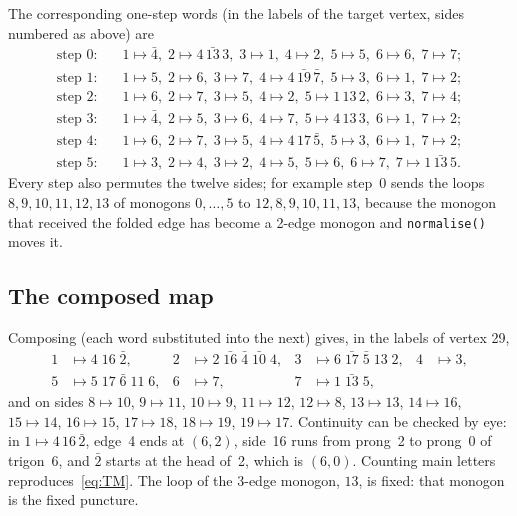 \documentclass[12pt]{amsart}
\newcommand{\anti}[1]{\bar{#1}}          %
\newcommand{\code}[1]{\texttt{#1}}
\theoremstyle{plain}
\theoremstyle{definition}
\begin{document}
The corresponding one-step words (in the labels of the target vertex,
sides numbered as above) are
\begin{align*}
  \text{step 0:}\quad & 1\mapsto\anti4,\; 2\mapsto 4\,\anti{13}\,3,\; 3\mapsto1,\; 4\mapsto2,\; 5\mapsto5,\; 6\mapsto6,\; 7\mapsto7;\\
  \text{step 1:}\quad & 1\mapsto5,\; 2\mapsto6,\; 3\mapsto7,\; 4\mapsto 4\,\anti{19}\,\anti7,\; 5\mapsto3,\; 6\mapsto1,\; 7\mapsto2;\\
  \text{step 2:}\quad & 1\mapsto6,\; 2\mapsto7,\; 3\mapsto5,\; 4\mapsto2,\; 5\mapsto 1\,13\,2,\; 6\mapsto3,\; 7\mapsto4;\\
  \text{step 3:}\quad & 1\mapsto\anti4,\; 2\mapsto5,\; 3\mapsto6,\; 4\mapsto7,\; 5\mapsto 4\,13\,3,\; 6\mapsto1,\; 7\mapsto2;\\
  \text{step 4:}\quad & 1\mapsto6,\; 2\mapsto7,\; 3\mapsto5,\; 4\mapsto 4\,17\,\anti5,\; 5\mapsto3,\; 6\mapsto1,\; 7\mapsto2;\\
  \text{step 5:}\quad & 1\mapsto3,\; 2\mapsto4,\; 3\mapsto2,\; 4\mapsto5,\; 5\mapsto6,\; 6\mapsto7,\; 7\mapsto 1\,\anti{13}\,5.
\end{align*}
Every step also permutes the twelve sides; for example step~0 sends the
loops $8,9,10,11,12,13$ of monogons $0,\dots,5$ to $12,8,9,10,11,13$,
because the monogon that received the folded edge has become a 2-edge
monogon and \code{normalise()} moves it.

\subsection{The composed map}
Composing (each word substituted into the next) gives, in the labels of
vertex 29,
\begin{equation}
  \label{eq:AM}
  \begin{aligned}
    1 &\mapsto 4\;16\;\anti2, &
    2 &\mapsto 2\;\anti{16}\;\anti4\;\anti{10}\;4, &
    3 &\mapsto 6\;\anti{17}\;\anti5\;13\;2, &
    4 &\mapsto 3,\\
    5 &\mapsto 5\;17\;\anti6\;11\;6, &
    6 &\mapsto 7, &
    7 &\mapsto 1\;\anti{13}\;5, &&
  \end{aligned}
\end{equation}
and on sides $8\mapsto10$, $9\mapsto11$, $10\mapsto9$, $11\mapsto12$,
$12\mapsto8$, $13\mapsto13$, $14\mapsto16$, $15\mapsto14$, $16\mapsto15$,
$17\mapsto18$, $18\mapsto19$, $19\mapsto17$.  Continuity can be checked by
eye: in $1\mapsto 4\,16\,\anti2$, edge~4 ends at $(6,2)$, side~16 runs from
prong~2 to prong~0 of trigon~6, and $\anti2$ starts at the head of~2, which
is $(6,0)$.  Counting main letters reproduces~\eqref{eq:TM}.  The loop of
the 3-edge monogon, $13$, is fixed: that monogon is the fixed puncture.
\end{document}
